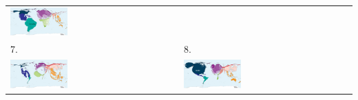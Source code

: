 \begin{center}
\begin{tabularx}{0.75\textwidth}{XX}
    \includegraphics[width=0.35\textwidth]{maps/picture_6.png} \\
    7. & 8. \\
    \includegraphics[width=0.35\textwidth]{maps/picture_7.png} &
    \includegraphics[width=0.35\textwidth]{maps/picture_8.png}
\end{tabularx}
\end{center}

\linespread{1.8}
